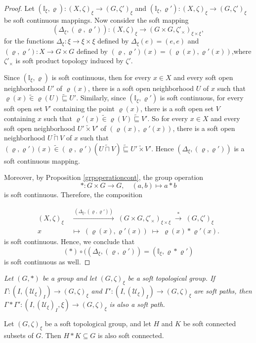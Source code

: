 \documentclass[preprint,12pt]{elsarticle}
\begin{document}
\begin{proof}
Let \((\mathbb{I}_\xi , \varrho)\colon (X,\zeta)_\xi\to (G,\zeta')_\xi \) and
\((\mathbb{I}_\xi , \varrho')\colon (X,\zeta)_\xi\to (G,\zeta')_\xi\) be  soft continuous
mappings. Now consider the soft mapping $$(\Delta_\xi, (\varrho,\varrho') ):
(X,\zeta)_\xi\to (G\times G,\zeta'_\times)_{\xi\times \xi},$$  for the functions
$\Delta_\xi\colon \xi \to \xi\times \xi$ defined by $\Delta_\xi(e)=(e,e)$ and
$(\varrho,\varrho'):X \to G\times G$ defined by $(\varrho,\varrho')(x)=(\varrho(x),\varrho'(x))$,where
$\zeta'_\times$ is soft product topology induced by $\zeta'$.

Since
$(\mathbb{I}_\xi , \varrho)$ is soft continuous, then  for every \( x \in X\) and
every soft open neighborhood \( U' \) of \( \varrho(x) \),
there is a soft  open neighborhood \( U \) of \( x \) such that
\(
\varrho(x) \widetilde{\in}\varrho(U) \widetilde{\sqsubseteq} U'
\). Similarly, since $(\mathbb{I}_\xi , \varrho')$ is soft continuous, for every soft open set $V'$ containing the point $\varrho(x)$,
there is a soft open set $V$ containing $x$ such that $\varrho'(x) \widetilde{\in}\varrho(V) \widetilde{\sqsubseteq} V'$.  So   for every \( x \in X\) and every soft open neighborhood \( U'\widetilde{\times}V' \) of \( (\varrho(x),\varrho'(x)) \),
there is a soft  open neighborhood \( U\widetilde{\sqcap}V \) of \( x \) such that
\(
(\varrho,\varrho')(x) \widetilde{\in} (\varrho,\varrho')(U\widetilde{\sqcap}V) \widetilde{\sqsubseteq} U'\widetilde{\times}V'
\). Hence $(\Delta_\xi, (\varrho,\varrho') )$ is a soft continuous mapping.

Moreover, by Proposition \ref{grpoperationcont}, the group operation
\[
\ast\colon G\times G\to G, \quad (a,b)\mapsto a\ast b
\]
is soft continuous. Therefore, the composition

\[
\begin{aligned}
(X,\zeta)_\xi
&\;\xrightarrow{\,(\Delta_\xi, (\varrho,\varrho') )\,}\;
(G\times G,\zeta'_{\times})_{\xi\times \xi}
\;\xrightarrow{\;\ast\;}\;
(G,\zeta')_\xi   \\[6pt]
x\;&\;\longmapsto\;(\varrho(x),\varrho'(x))\;\longmapsto\;\varrho(x)\ast \varrho'(x).
\end{aligned}
\]
is soft continuous. Hence, we conclude that
\[
(\ast)\circ((\Delta_\xi , (\varrho , \varrho'))=(\mathbb{I}_\xi , \varrho\ast \varrho')
\]
is soft continuous as well.


\end{proof}
\begin{ex}\em{
 Let $(G,\ast)$ be a group and let \( (G,\zeta)_\xi  \)  be a soft topological group. If $\Gamma:(I,(\mathscr{U}_\xi)_I) \to (G,\zeta)_\xi $ and $\Gamma':(I,(\mathscr{U}_\xi)_I) \to (G,\zeta)_\xi $ are  soft paths, then $\Gamma\ast\Gamma':(I,(\mathcal{U}_{\xi})_{I},\xi)\to (G,\zeta)_\xi  $ is also a soft path.}
\end{ex}
\begin{prop}
Let \( (G,\zeta)_\xi  \) be a soft topological group, and let $H$ and $K$
be soft connected subsets of $G$. Then  $H\ast K\subseteq G$ is also soft connected.
\end{prop}
\end{document}
